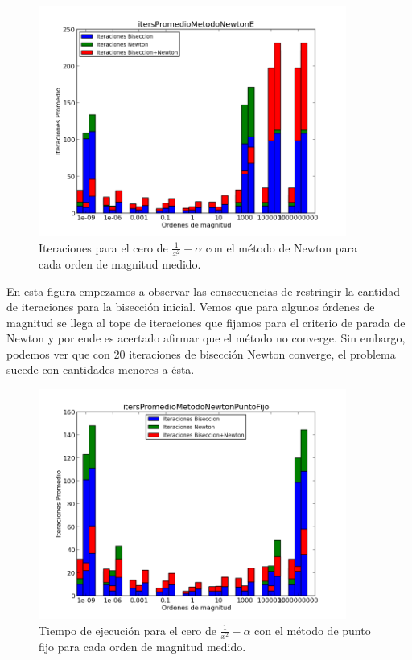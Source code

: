 \begin{figure}[H]
  \centering
    \includegraphics[width=0.9\textwidth]{../data/itersPromedioMetodoNewtonE.png}
    \caption{Iteraciones para el cero de $\frac{1}{x^2} - \alpha$ con el método de Newton para cada orden de magnitud medido.}
    \label{iters1}
\end{figure}

En esta figura empezamos a observar las consecuencias de restringir la cantidad de iteraciones para la bisección inicial. Vemos que para algunos órdenes de magnitud se llega al tope de iteraciones que fijamos para el criterio de parada de Newton y por ende es acertado afirmar que el método no converge. Sin embargo, podemos ver que con 20 iteraciones de bisección Newton converge, el problema sucede con cantidades menores a ésta.

\begin{figure}[H]
  \centering
    \includegraphics[width=0.9\textwidth]{../data/itersPromedioMetodoNewtonPuntoFijo.png}
    \caption{Tiempo de ejecución para el cero de $\frac{1}{x^2} - \alpha$ con el método de punto fijo para cada orden de magnitud medido.}
    \label{iters2}
\end{figure}

